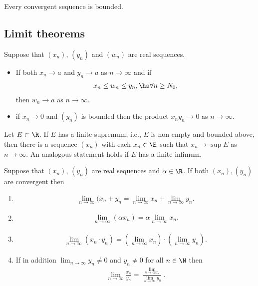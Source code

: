 \documentclass{article}
\begin{document}
\begin{theorem}
	Every convergent sequence is bounded.
\end{theorem}

\subsection{Limit theorems}

\begin{theorem}
	Suppose that $(x_n)$, $(y_n)$ and $(w_n)$ are real sequences.
	\begin{itemize}
		\item If both $x_n\to a$ and $y_n\to a$ as $n\to \infty$ and if \begin{align*}
			      x_n\leq w_n\leq y_n,\hs \forall n\geq N_0,
		      \end{align*}
		      then $w_n\to a$ as $n\to\infty$.
		\item if $x_n\to0$ and $(y_n)$ is bounded then the product $x_ny_n\to 0$ as $n\to\infty$.
	\end{itemize}
\end{theorem}

\setcounter{theorem}{2}
\begin{theorem}
	Let $E\subset\R$. If $E$ has a finite supremum, i.e., $E$ is non-empty and bounded above,
	then there is a sequence $(x_n)$ with each $x_n\in\E$ such that $x_n\to\sup E$ as $n\to\infty$.
	An analogous statement holds if $E$ has a finite infimum.
\end{theorem}

\begin{theorem}
	Suppose that $(x_n)$, $(y_n)$ are real sequences and $\alpha\in\R$. If both $(x_n), (y_n)$ are
	convergent then
	\begin{enumerate}
		\item \begin{align*}
			      \lim_{n\to\infty}(x_n+y_n=\lim_{n\to\infty}x_n + \lim_{n\to\infty}y_n.
		      \end{align*}
		\item \begin{align*}
			      \lim_{n\to\infty}(\alpha x_n) = \alpha\lim_{n\to\infty}x_n.
		      \end{align*}
		\item \begin{align*}
			      \lim_{n\to\infty}(x_n\cdot y_n) = \left(\lim_{n\to\infty}x_n\right)\cdot\left(\lim_{n\to\infty}y_n\right).
		      \end{align*}
		\item If in addition $\lim_{n\to\infty}y_n\not=0$ and $y_n\not=0$ for all $n\in\N$ then \begin{align*}
			      \lim_{n\to\infty}\frac{x_n}{y_n}=\frac{\lim_{n\to\infty x_n}}{\lim_{n\to\infty}y_n}.
		      \end{align*}
	\end{enumerate}
\end{theorem}
\end{document}
